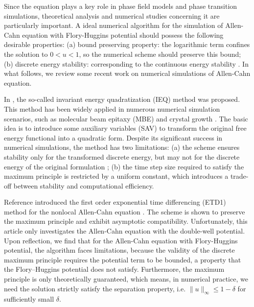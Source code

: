 Since the equation plays a key role in phase field models and phase transition simulations, 
theoretical analysis and numerical studies concerning it are particularly important. 
A ideal numerical algorithm for the simulation of Allen-Cahn equation with Flory-Huggins potential should possess the following desirable properties: 
(a) bound preserving property: the logarithmic term confines the solution to $0<u<1$,  so the numerical scheme should preserve this bound; 
(b) discrete energy stability: corresponding to the continuous energy stability \cite{provatas2011phase}. 
In what follows, we review some recent work on numerical simulations of Allen-Cahn equation.
\par In \cite{guillen2013linear,yang2017numerical}, 
the so-called invariant energy quadratization (IEQ) method was proposed. 
This method has been widely applied in numerous numerical simulation scenarios, such as molecular beam epitaxy (MBE) \cite{yang2017numerical} and crystal growth \cite{zhao2017numerical,zhao2018general}. 
The basic idea is to introduce some auxiliary variables (SAV) \cite{shen2018scalar} to transform the original free energy functional into a quadratic form. 
Despite its significant success in numerical simulations, the method has two limitations: 
(a) the scheme ensures stability only for the transformed discrete energy, but may not for the discrete energy of the original formulation 
\cite{yang2017numerical,wang2020stabilized}; 
(b) the time step size required to satisfy the maximum principle \cite{chen1992generation,nishiura1987stability} is restricted by a uniform constant, 
which introduces a trade-off between stability and computational efficiency.
\par Reference \cite{du2019maximum} introduced the first order exponential time differencing (ETD1) method for the nonlocal Allen-Cahn equation \cite{kroemer2025quantitative}. 
The scheme is shown to preserve the maximum principle and exhibit asymptotic compatibility. 
Unfortunately, this article only investigates the Allen-Cahn equation with the double-well potential. 
Upon reflection, we find that for the Allen-Cahn equation with Flory-Huggins potential, the algorithm faces limitations, 
because the validity of the discrete maximum principle requires the potential term to be bounded, 
a property that the Flory–Huggins potential does not satisfy. 
Furthermore, the maximum principle is only theoretically guaranteed, which means, 
in numerical practice, we need the solution strictly satisfy the separation property, i.e. $\|u\|_{\infty}\leq 1-\delta$ for sufficiently small $\delta$.

